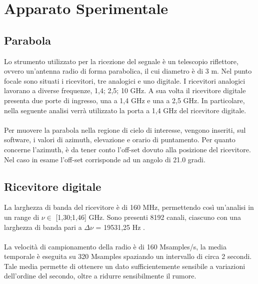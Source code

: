 \section{Apparato Sperimentale}



\subsection{Parabola}
Lo strumento utilizzato per la ricezione del segnale è un telescopio riflettore, ovvero un'antenna radio di forma parabolica, il cui diametro è di 3 m. Nel punto focale sono situati i ricevitori, tre analogici e uno digitale.
I ricevitori analogici lavorano a diverse frequenze, 1,4; 2,5; 10 GHz. A sua volta il ricevitore digitale presenta due porte di ingresso, una a 1,4 GHz e una a 2,5 GHz.
In particolare, nella seguente analisi verrà utilizzato la porta a 1,4 GHz del ricevitore digitale.
\\\\
Per muovere la parabola nella regione di cielo di interesse, vengono inseriti, sul software, i valori di azimuth, elevazione e orario di puntamento. Per quanto concerne l'azimuth, è da tener conto l'off-set dovuto alla posizione del ricevitore. Nel caso in esame l'off-set corrisponde ad un angolo di 21.0 gradi. 

\subsection{Ricevitore digitale}
La larghezza di banda del ricevitore è di 160 MHz, permettendo così un'analisi in un range di $\nu \in$  [1,30;1,46] GHz. Sono presenti 8192 canali, ciascuno con una larghezza di banda pari a $\Delta\nu$ = 19531,25 Hz \cite{Canali:canali}.%
\\\\
La velocità di campionamento della radio è di 160 Msamples/s, la media temporale è eseguita su 320 Msamples spaziando un intervallo di circa 2 secondi. Tale media permette di ottenere un dato sufficientemente sensibile a variazioni dell'ordine del secondo, oltre a ridurre sensibilmente il rumore. 


